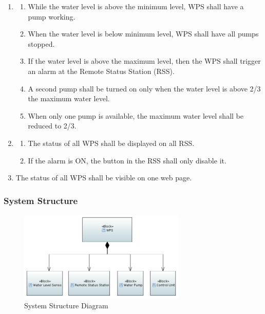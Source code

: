 \documentclass[11pt]{article}
\begin{document}
\begin{enumerate}[leftmargin=4em, font=\small, label=\textbf{SR-\arabic*}]
	\setlength\itemsep{.5em}
	\item 
		\begin{enumerate}[leftmargin=1.5em, font=\small, label=\textbf{.\arabic*:}]
		\setlength\itemsep{0em}
		\item While the water level is above the minimum level, WPS shall have a pump working.
		\item When the water level is below minimum level, WPS shall have all pumps stopped.
		\item If the water level is above the maximum level, then the WPS shall trigger an alarm at the Remote Status Station (RSS).
		\item A second pump shall be turned on only when the water level is above 2/3 the maximum water level.
		\item When only one pump is available, the maximum water level shall be reduced to 2/3.
		\end{enumerate}
	\item
		\begin{enumerate}[leftmargin=1.5em, font=\small, label=\textbf{.\arabic*:}]s
		\setlength\itemsep{0em}
		\item The status of all WPS shall be displayed on all RSS.
		\item If the alarm is ON, the button in the RSS shall only disable it.
		\end{enumerate}
	\item The status of all WPS shall be visible on one web page.

\end{enumerate}

\subsubsection{System Structure}

\begin{figure}[H]
  \includegraphics[width=300px]{../diagrams/system-structure.png}
  \caption{System Structure Diagram}
  \label{fig:System Structure Diagram}
\end{figure}
\end{document}
